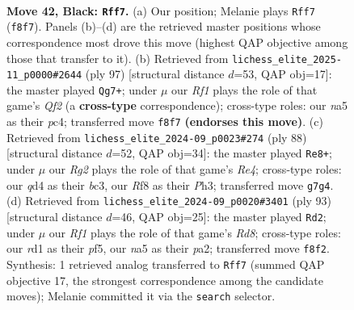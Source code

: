 \documentclass[11pt]{article}
\begin{document}
\clearpage

\begin{figure}[p]\centering
\begin{subfigure}{0.46\textwidth}\centering
\resizebox{\linewidth}{!}{%
\newchessgame
\chessboard[
  setfen={5rk1/6rp/8/Np5P/3Q2P1/8/PP3P1K/3R4 b - - 2 42},
  showmover=false,
  pgfstyle=straightmove, color=movearrow, markmove={f8-f7}
]}
\caption{}
\end{subfigure}\hfill
\begin{subfigure}{0.46\textwidth}\centering
\resizebox{\linewidth}{!}{%
\newchessgame
\chessboard[
  setfen={8/5q1k/5r1p/3PQP2/2P3K1/1p6/4R2P/8 b - - 0 49},
  showmover=false,
  pgfstyle=straightmove, color=movearrow, markmove={f7-g7}
]}
\caption{}
\end{subfigure}
\\[4pt]
\begin{subfigure}{0.46\textwidth}\centering
\resizebox{\linewidth}{!}{%
\newchessgame
\chessboard[
  setfen={7k/8/p5q1/7p/2p1R3/2b4P/P4P2/4RK2 w - - 0 45},
  showmover=false,
  pgfstyle=straightmove, color=movearrow, markmove={e4-e8}
]}
\caption{}
\end{subfigure}\hfill
\begin{subfigure}{0.46\textwidth}\centering
\resizebox{\linewidth}{!}{%
\newchessgame
\chessboard[
  setfen={8/p5rk/3P1Q2/2p2P2/8/8/P4PPK/3r4 b - - 0 47},
  showmover=false,
  pgfstyle=straightmove, color=movearrow, markmove={d1-d2}
]}
\caption{}
\end{subfigure}
\caption{\textbf{Move 42, Black: \texttt{Rff7}.} (a) Our position; Melanie plays \texttt{Rff7} (\texttt{f8f7}). Panels (b)--(d) are the retrieved master positions whose correspondence most drove this move (highest QAP objective among those that transfer to it). (b) Retrieved from \texttt{lichess\_elite\_2025-11\_p0000\#2644} (ply 97) [structural distance $d$=53, QAP obj=17]: the master played \texttt{Qg7+}; under $\mu$ our \emph{Rf1} plays the role of that game's \emph{Qf2} (a \textbf{cross-type} correspondence); cross-type roles: our \emph{n}a5 as their \emph{p}c4; transferred move \texttt{f8f7} \textbf{(endorses this move)}. (c) Retrieved from \texttt{lichess\_elite\_2024-09\_p0023\#274} (ply 88) [structural distance $d$=52, QAP obj=34]: the master played \texttt{Re8+}; under $\mu$ our \emph{Rg2} plays the role of that game's \emph{Re4}; cross-type roles: our \emph{q}d4 as their \emph{b}c3, our \emph{R}f8 as their \emph{P}h3; transferred move \texttt{g7g4}. (d) Retrieved from \texttt{lichess\_elite\_2024-09\_p0020\#3401} (ply 93) [structural distance $d$=46, QAP obj=25]: the master played \texttt{Rd2}; under $\mu$ our \emph{Rf1} plays the role of that game's \emph{Rd8}; cross-type roles: our \emph{r}d1 as their \emph{p}f5, our \emph{n}a5 as their \emph{p}a2; transferred move \texttt{f8f2}. Synthesis: 1 retrieved analog transferred to \texttt{Rff7} (summed QAP objective 17, the strongest correspondence among the candidate moves); Melanie committed it via the \texttt{search} selector.}
\label{fig:thought-m83}
\end{figure}
\end{document}
